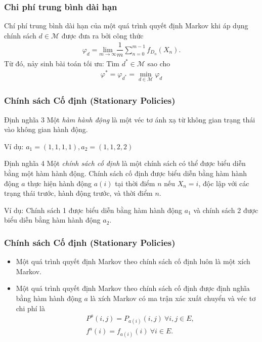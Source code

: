 \documentclass[12pt]{beamer}
\begin{document}
\begin{frame}
	\frametitle{Chi phí trung bình dài hạn}
	  Chí phí trung bình dài hạn của một quá trình quyết định Markov khi áp dụng chính sách $d \in \mathcal{M}$ được đưa ra bởi công thức
	\begin{align*}
	\varphi_d=\underset{m \rightarrow \infty}{\mathrm{lim}}\dfrac{1}{m}\sum_{n=0}^{m-1}f_{D_n}(X_n). 
	\end{align*}
	Từ đó, nảy sinh bài toán tối ưu: Tìm $d^* \in \mathcal{M}$ sao cho 
	\begin{align}
	\varphi^*=\varphi_{d^*}=\underset{d \in \mathcal{M}}{\min} \varphi_d
	\end{align}
\end{frame}

\begin{frame}
	\frametitle{Chính sách Cố định (Stationary Policies)}
	\begin{block}{Định nghĩa 3}
		Một \textit{hàm hành động} là một véc tơ ánh xạ từ không gian trạng thái vào không gian hành động.
	\end{block}
    Ví dụ: $a_1=(1,1,1,1), a_2=(1,1,2,2)$
	\begin{block}{Định nghĩa 4}
	 Một \textit{chính sách cố định} là một chính sách có thể được biểu diễn bằng một hàm hành động. Chính sách cố định được biểu diễn bằng hàm hành động $a$ thực hiện hành động $a(i)$ tại thời điểm $n$ nếu $X_n=i$, độc lập với các trạng thái trước, hành động trước, và thời điểm $n$. 
    \end{block}
    Ví dụ: Chính sách 1 được biểu diễn bằng hàm hành động $a_1$ và chính sách 2 được biểu diễn bằng hàm hành động $a_2$.
\end{frame}

\begin{frame}
	\frametitle{Chính sách Cố định (Stationary Policies)}
	\begin{itemize}
		\item  Một quá trình quyết định Markov theo chính sách cố định luôn là một xích Markov.
		\item Một quá trình quyết định Markov theo chính sách cố định được định nghĩa bằng hàm hành động $a$ là xích Markov có ma trận xác xuất chuyển và véc tơ chi phí là
		\begin{align}
		&P^a(i,j)=P_{a(i)}(i,j) \ \forall i,j \in E,\\
		&f^a(i)=f_{a(i)}(i) \  \forall i\in E.
		\end{align} 
	\end{itemize}
\end{frame}
\end{document}
